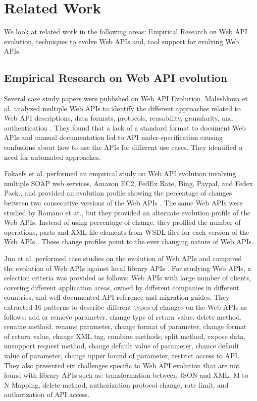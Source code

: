 \documentclass[conference]{IEEEtran}
\begin{document}
\section{Related Work}

We look at related work in the following areas: Empirical Research on Web API evolution, techniques to evolve Web APIs and, tool support for evolving Web APIs.

\subsection{Empirical Research on Web API evolution} %
\label{sub:empirical_research}
Several case study papers were published on Web API Evolution. Maleshkova et al. analyzed multiple Web APIs to identify the different approaches related to Web API descriptions, data formats, protocols, reusability, granularity, and authentication \cite{maleshkova}. They found that a lack of a standard format to document Web APIs and manual documentation led to API under-specification causing confusions about how to use the APIs for different use cases. They identified a need for automated approaches.

Fokaefs et al. performed an empirical study on Web API evolution involving multiple SOAP web services, Amazon EC2, FedEx Rate, Bing, Paypal, and Fedex Pack., and provided an evolution profile showing the percentage of changes between two consecutive versions of the Web APIs \cite{fokaefs_2011_empirical}. The same Web APIs were studied by Romano et at., but they provided an alternate evolution profile of the Web APIs. Instead of using percentage of change, they profiled the number of operations, parts and XML file elements from WSDL files for each version of the Web APIs \cite{wsdl_diff_2012}. These change profiles point to the ever changing nature of Web APIs.

Jun et al. performed case studies on the evolution of Web APIs and compared the evolution of Web APIs against local library APIs \cite{li_client_2013}. For studying Web APIs, a selection criteria was provided as follows: Web APIs with large number of clients, covering different application areas, owned by different companies in different countries, and well documented API reference and migration guides. They extracted 16 patterns to describe different types of changes on the Web APIs as follows: add or remove parameter, change type of return value, delete method, rename method, rename parameter, change format of parameter, change format of return value, change XML tag, combine methods, split method, expose data, unsupport request method, change default value of parameter, chance default value of parameter, change upper bound of parameter, restrict access to API. They also presented six challenges specific to Web API evolution that are not found with library APIs such as: transformation between JSON and XML, M to N Mapping, delete method, authorization protocol change, rate limit, and authorization of API access.
\end{document}
